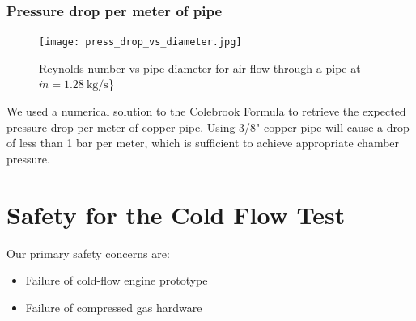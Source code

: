 \documentclass{article}
\begin{document}
\subsubsection*{Pressure drop per meter of pipe}
\begin{figure}[h!]
\centering
\texttt{[image: press\_drop\_vs\_diameter.jpg]}
\caption{Reynolds number vs pipe diameter for air flow through a pipe at $\dot{m} = \SI{1.28}{\kg\per\second}$\}} 
\label{press_drop}
\end{figure} 
We used a numerical solution to the Colebrook Formula to retrieve the expected pressure drop per meter of copper pipe. Using 3/8" copper pipe will cause a drop of less than 1 bar per meter, which is sufficient to achieve appropriate chamber pressure.

\section*{Safety for the Cold Flow Test}
Our primary safety concerns are:
\begin{itemize}
\item Failure of cold-flow engine prototype
\item Failure of compressed gas hardware
\end{itemize}
\end{document}
